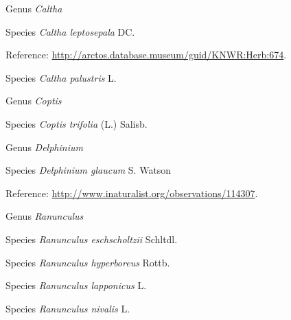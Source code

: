 \documentclass[9pt, article]{memoir}
\begin{document}
\begin{multicols}{2}
\vspace{6pt}\noindent\hspace{30pt}Genus \textit{Caltha}


\vspace{6pt}\noindent\hspace{36pt}Species \textit{Caltha leptosepala} DC.


\vspace{6pt}Reference: 
\url{http://arctos.database.museum/guid/KNWR:Herb:674}.

\vspace{6pt}\noindent\hspace{36pt}Species \textit{Caltha palustris} L.


\vspace{6pt}\noindent\hspace{30pt}Genus \textit{Coptis}


\vspace{6pt}\noindent\hspace{36pt}Species \textit{Coptis trifolia} (L.) Salisb.


\vspace{6pt}\noindent\hspace{30pt}Genus \textit{Delphinium}


\vspace{6pt}\noindent\hspace{36pt}Species \textit{Delphinium glaucum} S. Watson


\vspace{6pt}Reference: 
\url{http://www.inaturalist.org/observations/114307}.

\vspace{6pt}\noindent\hspace{30pt}Genus \textit{Ranunculus}


\vspace{6pt}\noindent\hspace{36pt}Species \textit{Ranunculus eschscholtzii} Schltdl.


\vspace{6pt}\noindent\hspace{36pt}Species \textit{Ranunculus hyperboreus} Rottb.


\vspace{6pt}\noindent\hspace{36pt}Species \textit{Ranunculus lapponicus} L.


\vspace{6pt}\noindent\hspace{36pt}Species \textit{Ranunculus nivalis} L.



\end{multicols}
\end{document}
